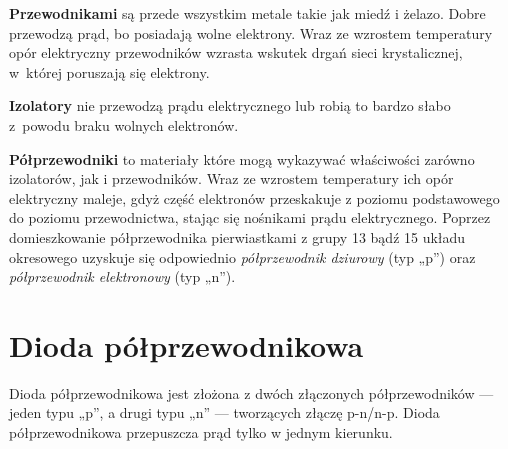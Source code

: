 \textbf{Przewodnikami} są przede wszystkim metale takie jak miedź i żelazo. Dobre przewodzą prąd,
bo posiadają wolne elektrony. Wraz ze wzrostem temperatury opór elektryczny przewodników wzrasta
wskutek drgań sieci krystalicznej, w~której poruszają się elektrony.

\textbf{Izolatory} nie przewodzą prądu elektrycznego lub robią to bardzo słabo z~powodu braku
wolnych elektronów.

\textbf{Półprzewodniki} to materiały które mogą wykazywać właściwości zarówno izolatorów, jak i
przewodników. Wraz ze wzrostem temperatury ich opór elektryczny maleje, gdyż część elektronów
przeskakuje z poziomu podstawowego do poziomu przewodnictwa, stając się nośnikami prądu
elektrycznego. Poprzez domieszkowanie półprzewodnika pierwiastkami z grupy 13 bądź 15 układu
okresowego uzyskuje się odpowiednio \emph{półprzewodnik dziurowy} (typ „p”) oraz \emph{półprzewodnik
elektronowy} (typ „n”).

\section{Dioda półprzewodnikowa}
Dioda półprzewodnikowa jest złożona z dwóch złączonych półprzewodników --- jeden typu „p”, a drugi
typu „n” --- tworzących złączę p-n/n-p. Dioda półprzewodnikowa przepuszcza prąd tylko w jednym kierunku.

